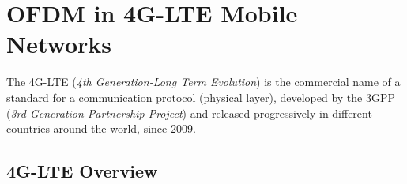 \chapter{OFDM in 4G-LTE Mobile Networks}

\indent The 4G-LTE (\textit{4th Generation-Long Term Evolution}) is the commercial name of a standard for a communication protocol (physical layer), developed by the 3GPP (\textit{3rd Generation Partnership Project}) and released progressively in different countries around the world, since 2009.

\section{4G-LTE Overview}
